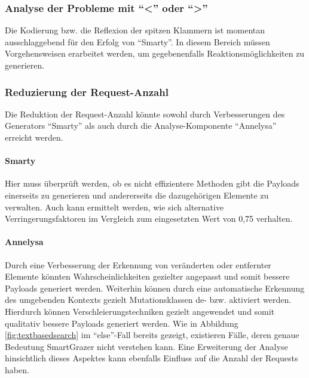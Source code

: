 \subsubsection{Analyse der Probleme mit ``<'' oder ``>''}
Die Kodierung bzw. die Reflexion der spitzen Klammern ist momentan ausschlaggebend für den Erfolg von ``Smarty''. In diesem Bereich müssen Vorgehensweisen erarbeitet werden, um gegebenenfalls Reaktionsmöglichkeiten zu generieren.

\subsubsection{Reduzierung der Request-Anzahl}

Die Reduktion der Request-Anzahl könnte sowohl durch Verbesserungen des Generators ``Smarty'' als auch durch die Analyse-Komponente ``Annelysa'' erreicht werden.

\paragraph{Smarty} Hier muss überprüft werden, ob es nicht effizientere Methoden gibt die Payloads einerseits zu generieren und andererseits die dazugehörigen Elemente zu verwalten. Auch kann ermittelt werden, wie sich alternative Verringerungsfaktoren im Vergleich zum eingesetzten Wert von 0,75 verhalten.

\paragraph{Annelysa} Durch eine Verbesserung der Erkennung von veränderten oder entfernter Elemente könnten Wahrscheinlichkeiten gezielter angepasst und somit bessere Payloads generiert werden. Weiterhin können durch eine automatische Erkennung des umgebenden Kontexts gezielt Mutationsklassen de- bzw. aktiviert werden. Hierdurch können Verschleierungstechniken gezielt angewendet und somit qualitativ bessere Payloads generiert werden. Wie in Abbildung \ref{fig:textbasedsearch} im ``else''-Fall bereits gezeigt, existieren Fälle, deren genaue Bedeutung SmartGrazer nicht verstehen kann. Eine Erweiterung der Analyse hinsichtlich dieses Aspektes kann ebenfalls Einfluss auf die Anzahl der Requests haben.
